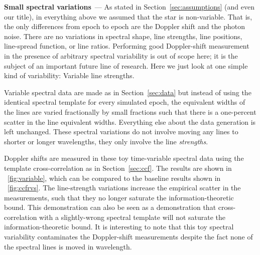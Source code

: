 \documentclass[modern]{aastex631}
\renewcommand{\paragraph}[1]{\bigskip\noindent\textbf{#1}~---}
\newcommand{\sectionname}{Section}
\newcommand{\secref}[1]{\sectionname~\ref{#1}}
\newcommand{\figref}[1]{\figurename~\ref{#1}}
\begin{document}
\paragraph{Small spectral variations}
As stated in \secref{sec:assumptions} (and even our title), in everything above we assumed that the star is non-variable. That is, the only differences from epoch to epoch are the Doppler shift and the photon noise.
There are no variations in spectral shape, line strengths, line positions, line-spread function, or line ratios.
Performing good Doppler-shift measurement in the presence of arbitrary spectral variability is out of scope here; it is the subject of an important future line of research.
Here we just look at one simple kind of variability: Variable line strengths.

Variable spectral data are made as in \secref{sec:data} but instead of using the identical spectral template for every simulated epoch, the equivalent widths of the lines are varied fractionally by small fractions such that there is a one-percent scatter in the line equivalent widths.
Everything else about the data generation is left unchanged.
These spectral variations do not involve moving any lines to shorter or longer wavelengths, they only involve the line \emph{strengths}.

Doppler shifts are measured in these toy time-variable spectral data using the template cross-correlation as in \secref{sec:ccf}.
The results are shown in \figref{fig:variable}, which can be compared to the baseline results shown in \figref{fig:ccfrvs}.
The line-strength variations increase the empirical scatter in the measurements, such that they no longer saturate the information-theoretic bound.
This demonstration can also be seen as a demonstration that cross-correlation with a slightly-wrong spectral template will not saturate the information-theoretic bound.
It is interesting to note that this toy spectral variability contaminates the Doppler-shift measurements despite the fact none of the spectral lines is moved in wavelength.
\end{document}
